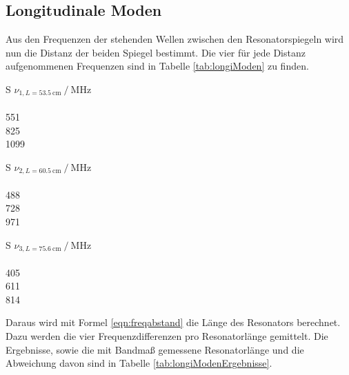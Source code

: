 \subsection{Longitudinale Moden}

Aus den Frequenzen der stehenden Wellen zwischen den Resonatorspiegeln wird nun die Distanz der beiden Spiegel bestimmt. Die vier für jede Distanz aufgenommenen Frequenzen sind in Tabelle \ref{tab:longiModen} zu finden.
\begin{table}
  \centering
  \begin{tabular}{S}
    \toprule
    {$\nu_{1, L = \SI{53.5}{\centi\meter}}\:/\:\si{\mega\hertz}$}\\
    \\
551\\
825\\
1099\\
    \bottomrule
  \end{tabular}
  \begin{tabular}{S}
    \toprule
    {$\nu_{2, L = \SI{60.5}{\centi\meter}}\:/\:\si{\mega\hertz}$}\\
    \\
488\\
728\\
971\\
    \bottomrule
  \end{tabular}
  \begin{tabular}{S}
    \toprule
    {$\nu_{3, L = \SI{75.6}{\centi\meter}}\:/\:\si{\mega\hertz}$}\\
    \\
405\\
611\\
814\\
    \bottomrule
  \end{tabular}
  \caption{Messwerte der Frequenzmessung bei unterschiedlichen Resonatorlängen. Als Fehler der Frequenzmessung wird $\sigma_{\nu} = \SI{5}{\mega\hertz}$ angenommen.}
  \label{tab:longiModen}
\end{table}

Daraus wird mit Formel \eqref{eqn:freqabstand} die Länge des Resonators berechnet. Dazu werden die vier Frequenzdifferenzen pro Resonatorlänge gemittelt. Die Ergebnisse, sowie die mit Bandmaß gemessene Resonatorlänge und die Abweichung davon sind in Tabelle \ref{tab:longiModenErgebnisse}.


